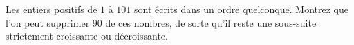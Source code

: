 Les entiers positifs de $1$ à $101$ sont écrits dans un ordre quelconque.
Montrez que l'on peut supprimer $90$ de ces nombres, de sorte qu'il reste une
sous-suite strictement croissante ou décroissante.
